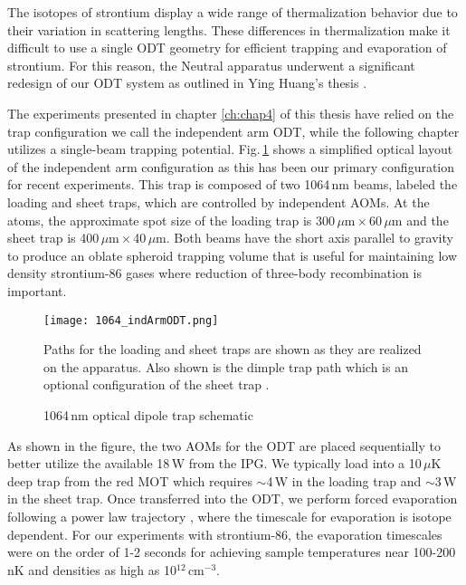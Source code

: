 The isotopes of strontium display a wide range of thermalization behavior due to their variation in scattering lengths.
These differences in thermalization make it difficult to use a single ODT geometry for efficient trapping and evaporation of strontium.
For this reason, the Neutral apparatus underwent a significant redesign of our ODT system as outlined in Ying Huang's thesis \cite{Huang2013}.

The experiments presented in chapter \ref{ch:chap4} of this thesis have relied on the trap configuration we call the independent arm ODT, while the following chapter utilizes a single-beam trapping potential.
Fig.\,\ref{fig:odtSchematic} shows a simplified optical layout of the independent arm configuration as this has been our primary configuration for recent experiments.
This trap is composed of two 1064\,nm beams, labeled the loading and sheet traps, which are controlled by independent AOMs.
At the atoms, the approximate spot size of the loading trap is 300\,$\mu$m\,$\times$\,60\,$\mu$m and the sheet trap is 400\,$\mu$m\,$\times$\,40\,$\mu$m.
Both beams have the short axis parallel to gravity to produce an oblate spheroid trapping volume that is useful for maintaining low density strontium-86 gases where reduction of three-body recombination is important.
	\begin{figure} 
		\centerline{
		\texttt{[image: 1064\_indArmODT.png]}}
		\caption{1064\,nm optical dipole trap schematic}{Paths for the loading and sheet traps are shown as they are realized on the apparatus. Also shown is the dimple trap path which is an optional configuration of the sheet trap \cite{Huang2013}.}
		\label{fig:odtSchematic}
	\end{figure}

As shown in the figure, the two AOMs for the ODT are placed sequentially to better utilize the available 18\,W from the IPG.
We typically load into a 10\,$\mu$K deep trap from the red MOT which requires $\sim$4\,W in the loading trap and $\sim$3\,W in the sheet trap.
Once transferred into the ODT, we perform forced evaporation following a power law trajectory \cite{OHara2001}, where the timescale for evaporation is isotope dependent.
For our experiments with strontium-86, the evaporation timescales were on the order of 1-2 seconds for achieving sample temperatures near 100-200\,nK and densities as high as 10$^{12}$\,cm$^{-3}$.

